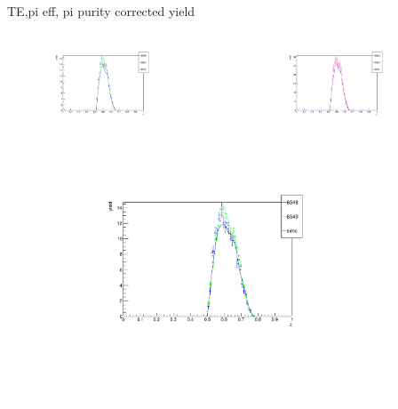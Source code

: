 \begin{frame}{TE,pi eff, pi purity corrected yield}
\begin{columns}
\begin{column}[T]{0.5\textwidth}
\includegraphics[width = 0.7\textwidth]{results/yield/check/yieldcheck_400_neg.pdf}
\end{column}
\begin{column}[T]{0.5\textwidth}
\includegraphics[width = 0.7\textwidth]{results/yield/check/yieldcheck_400_pos.pdf}
\end{column}
\end{columns}
\begin{columns}
\begin{column}[T]{0.5\textwidth}
\includegraphics[width = 0.7\textwidth]{results/yield/check/yieldcheck_390_neg.pdf}

\end{column}
\end{columns}
\end{frame}
